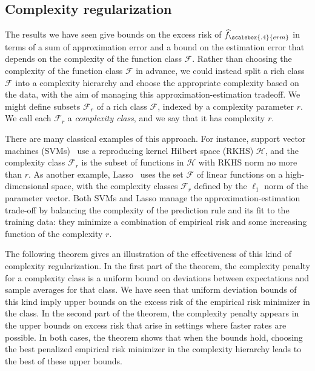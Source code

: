 \subsection{Complexity regularization}

The results we have seen give bounds on the excess risk of $\widehat{f}_{\scalebox{.4}{erm}}$ in terms of a sum of approximation error and a bound on the estimation error that depends on the complexity of the function class ${\mathcal F}$. Rather than choosing the complexity of the function class ${\mathcal F}$ in advance, we could instead split a rich class ${\mathcal F}$ into a complexity hierarchy and choose the appropriate complexity based on the data, with the aim of managing this approximation-estimation tradeoff. We might define subsets ${\mathcal F}_r$ of a rich class ${\mathcal F}$, indexed by a complexity parameter $r$. We call each ${\mathcal F}_r$ a {\em complexity class}, and we say that it has complexity $r$.

There are many classical examples of this approach. For instance, support vector machines (SVMs)~\cite{cv-svn-95} use a reproducing kernel Hilbert space (RKHS) ${\mathcal H}$, and the complexity class ${\mathcal F}_r$ is the subset of functions in ${\mathcal H}$ with RKHS norm no more than $r$. As another example, Lasso~\cite{t-rssvl-96} uses the set ${\mathcal F}$ of linear functions on a high-dimensional space, with the complexity classes ${\mathcal F}_r$ defined by the $\ell_1$ norm of the parameter vector. Both SVMs and Lasso manage the approximation-estimation trade-off by balancing the complexity of the prediction rule and its fit to the training data: they minimize a combination of empirical risk and some increasing function of the complexity $r$.

The following theorem gives an illustration of the effectiveness of this kind of complexity regularization. In the first part of the theorem, the complexity penalty for a complexity class is a uniform bound on deviations between expectations and sample averages for that class.  We have seen that uniform deviation bounds of this kind imply upper bounds on the excess risk of the empirical risk minimizer in the class.  In the second part of the theorem, the complexity penalty appears in the upper bounds on excess risk that arise in settings where faster rates are possible. In both cases, the theorem shows that when the bounds hold, choosing the best penalized empirical risk minimizer in the complexity hierarchy leads to the best of these upper bounds.

